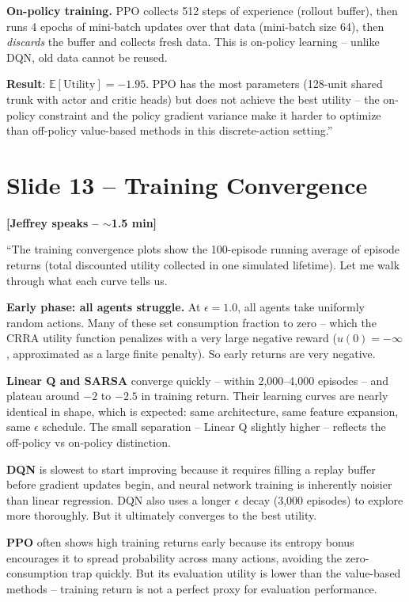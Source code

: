 \documentclass[11pt, letterpaper]{article}
\begin{document}
\textbf{On-policy training.} PPO collects 512 steps of experience (rollout buffer), then runs 4 epochs of mini-batch updates over that data (mini-batch size 64), then \emph{discards} the buffer and collects fresh data. This is on-policy learning -- unlike DQN, old data cannot be reused.

\textbf{Result}: $\mathbb{E}[\text{Utility}] = -1.95$. PPO has the most parameters (128-unit shared trunk with actor and critic heads) but does not achieve the best utility -- the on-policy constraint and the policy gradient variance make it harder to optimize than off-policy value-based methods in this discrete-action setting.''

\section{Slide 13 -- Training Convergence}

\textbf{[Jeffrey speaks -- $\sim$1.5 min]}

``The training convergence plots show the 100-episode running average of episode returns (total discounted utility collected in one simulated lifetime). Let me walk through what each curve tells us.

\textbf{Early phase: all agents struggle.} At $\epsilon = 1.0$, all agents take uniformly random actions. Many of these set consumption fraction to zero -- which the CRRA utility function penalizes with a very large negative reward ($u(0) = -\infty$, approximated as a large finite penalty). So early returns are very negative.

\textbf{Linear Q and SARSA} converge quickly -- within 2,000--4,000 episodes -- and plateau around $-2$ to $-2.5$ in training return. Their learning curves are nearly identical in shape, which is expected: same architecture, same feature expansion, same $\epsilon$ schedule. The small separation -- Linear Q slightly higher -- reflects the off-policy vs on-policy distinction.

\textbf{DQN} is slowest to start improving because it requires filling a replay buffer before gradient updates begin, and neural network training is inherently noisier than linear regression. DQN also uses a longer $\epsilon$ decay (3,000 episodes) to explore more thoroughly. But it ultimately converges to the best utility.

\textbf{PPO} often shows high training returns early because its entropy bonus encourages it to spread probability across many actions, avoiding the zero-consumption trap quickly. But its evaluation utility is lower than the value-based methods -- training return is not a perfect proxy for evaluation performance.
\end{document}
